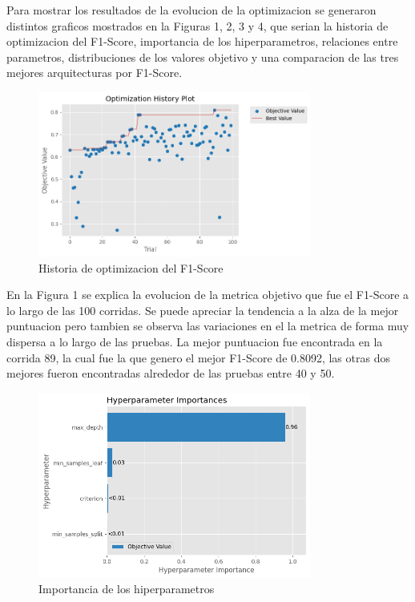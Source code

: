 \documentclass[12pt,a4paper]{article}
\begin{document}
Para mostrar los resultados de la evolucion de la optimizacion se generaron distintos graficos mostrados en la Figuras 1, 2, 3 y 4,
que serian la historia de optimizacion del F1-Score, importancia de los hiperparametros,
relaciones entre parametros, distribuciones de los valores objetivo y una comparacion de las tres mejores arquitecturas por F1-Score.

\begin{figure}[H]
  \centering
  \includegraphics[width=0.8\textwidth]{../img/OptimizationHistory.png}
  \caption{Historia de optimizacion del F1-Score}\label{fig:decison-tree-optimization-history}
\end{figure}

En la Figura 1 se explica la evolucion de la metrica objetivo que fue el F1-Score a lo largo de las 100 corridas.
Se puede apreciar la tendencia a la alza de la mejor puntuacion pero tambien se observa las variaciones en el la
metrica de forma muy dispersa a lo largo de las pruebas.
La mejor puntuacion fue encontrada en la corrida 89, la cual fue la que genero el mejor F1-Score de 0.8092, las otras dos
mejores fueron encontradas alrededor de las pruebas entre 40 y 50.

\begin{figure}[H]
  \centering
  \includegraphics[width=0.8\textwidth]{../img/HyperparameterImportance.png}
  \caption{Importancia de los hiperparametros}\label{fig:decison-tree-hyperparameter-importance}
\end{figure}
\end{document}
